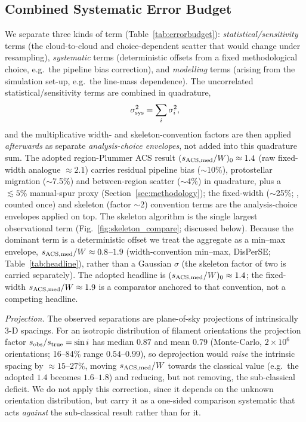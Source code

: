 \documentclass[usenatbib,twoside,twocolumn]{mnras}
\begin{document}
\subsection{Combined Systematic Error Budget}
\label{sec:error_budget}

We separate three kinds of term (Table~\ref{tab:errorbudget}): \emph{statistical/sensitivity} terms (the cloud-to-cloud and choice-dependent scatter that would change under resampling), \emph{systematic} terms (deterministic offsets from a fixed methodological choice, e.g.\ the pipeline bias correction), and \emph{modelling} terms (arising from the simulation set-up, e.g.\ the line-mass dependence). The uncorrelated statistical/sensitivity terms are combined in quadrature,
\begin{equation}
\sigma_{\rm sys}^2=\sum_i\sigma_i^2,
\label{eq:quadrature}
\end{equation}
and the multiplicative width- and skeleton-convention factors are then applied \emph{afterwards} as separate \emph{analysis-choice envelopes}, not added into this quadrature sum. The adopted region-Plummer ACS result $(s_{\rm ACS,med}/W)_0\approx1.4$ (raw fixed-width analogue $\approx2.1$) carries residual pipeline bias ($\sim$10\%), protostellar migration ($\sim$7.5\%) and between-region scatter ($\sim$4\%) in quadrature, plus a $\lesssim5\%$ manual-spur proxy (Section~\ref{sec:methodology}); the fixed-width ($\sim$25\%; \citealt{Panopoulou2022}, counted once) and skeleton (factor $\sim$2) convention terms are the analysis-choice envelopes applied on top. The skeleton algorithm is the single largest observational term (Fig.~\ref{fig:skeleton_compare}; discussed below). Because the dominant term is a deterministic offset we treat the aggregate as a min--max envelope, $s_{\rm ACS,med}/W\approx0.8$--$1.9$ (width-convention min--max, DisPerSE; Table~\ref{tab:headline}), rather than a Gaussian $\sigma$ (the skeleton factor of two is carried separately). The adopted headline is $(s_{\rm ACS,med}/W)_0\approx1.4$; the fixed-width $s_{\rm ACS,med}/W\approx1.9$ is a comparator anchored to that convention, not a competing headline.

\emph{Projection.} The observed separations are plane-of-sky projections of intrinsically 3-D spacings. For an isotropic distribution of filament orientations the projection factor $s_{\rm obs}/s_{\rm true}=\sin i$ has median $0.87$ and mean $0.79$ (Monte-Carlo, $2\times10^6$ orientations; 16--84\% range $0.54$--$0.99$), so deprojection would \emph{raise} the intrinsic spacing by $\approx15$--$27\%$, moving $s_{\rm ACS,med}/W$ towards the classical value (e.g.\ the adopted $1.4$ becomes $1.6$--$1.8$) and reducing, but not removing, the sub-classical deficit. We do not apply this correction, since it depends on the unknown orientation distribution, but carry it as a one-sided comparison systematic that acts \emph{against} the sub-classical result rather than for it.
\end{document}
